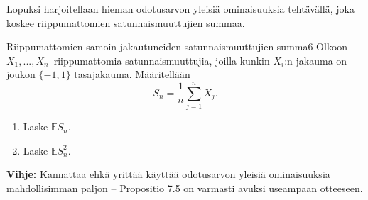\documentclass[11pt,a4paper]{amsart}
\newcommand{\E}{\mathbb{E}}
\newcommand{\1}{\mathbf{1}}
\begin{document}
Lopuksi harjoitellaan hieman odotusarvon yleisiä ominaisuuksia tehtävällä, joka koskee riippumattomien satunnaismuuttujien summaa. 

\begin{Exercises}{Riippumattomien samoin jakautuneiden satunnaismuuttujien summa}{6}
Olkoon $X_1,...,X_n$ riippumattomia satunnaismuuttujia, joilla kunkin $X_i$:n jakauma on joukon $\{-1,1\}$ tasajakauma. Määritellään 
\[
S_n=\frac{1}{n}\sum_{j=1}^n X_j.
\]
\begin{enumerate}
\item Laske $\E S_n$. 

\item Laske $\E S_n^2$.

\end{enumerate}
{\bf Vihje:} Kannattaa ehkä yrittää käyttää odotusarvon yleisiä ominaisuuksia mahdollisimman paljon -- Propositio 7.5 on varmasti avuksi useampaan otteeseen.
\end{Exercises}
\end{document}
